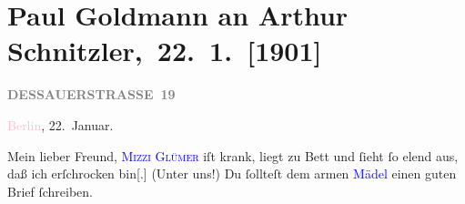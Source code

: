 

\renewcommand{\erwaehntePersonen}{Personen: Richard Beer-Hofmann, Otto Brahm, Marie Glümer, Alfred Kerr, Olga Schnitzler, Stefan Vacano}
\renewcommand{\erwaehnteInstitutionen}{Institutionen: Deutsches Theater Berlin}
\renewcommand{\erwaehnteOrte}{Orte: Berlin, Dessauer Straße, Wien}
\renewcommand{\erwaehnteWerke}{Werke: Der Tag, Michael Kramer. Drama, Neue Freie Presse, Zum großen Wurstel. Burleske in einem Akt, »Michael Kramer.«}
\section[ Paul Goldmann an Arthur Schnitzler, 22. 1. {[}1901{]}]{Paul Goldmann an Arthur Schnitzler, 22. 1. {[}1901{]}}
\nopagebreak{}
\rehead{ }\normalsize\beginnumbering{}
\toendnotes[C]{\smallbreak\pagebreak[2]}
\toendnotes[C]{\smallbreak}
\pstart
           \noindent{}\raggedleft{}{\pb}\textcolor{pink}{\textcolor{gray}{\textbf{DESSAUERSTRASSE 19}}}{}\ledrightnote{\textcolor{pink}{Dessauer Straße}}\pend
           
\pstart
           \textcolor{pink}{Berlin}{}\ledrightnote{\textcolor{pink}{Berlin}}, 22. Januar.\pend
           
\pstart\center{}Mein lieber Freund,\pend
\pstart
           \textsc{\textcolor{blue}{Mizzi Glümer}{}\ledrightnote{\textcolor{blue}{Marie Glümer}}} iſt krank, liegt zu Bett und ſieht ſo elend aus, daß ich erſchrocken
                  bin{[}.{]} (Unter uns!) Du ſollteſt dem armen \textcolor{blue}{Mädel}{}\ledrightnote{{$\rightarrow$}\textcolor{blue}{Marie Glümer}} einen guten Brief ſchreiben.\pend
           
